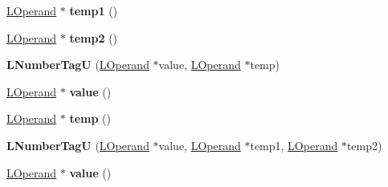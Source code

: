 \begin{DoxyCompactItemize}
\item 
\hyperlink{classv8_1_1internal_1_1_l_operand}{L\+Operand} $\ast$ {\bfseries temp1} ()\hypertarget{classv8_1_1internal_1_1_l_number_tag_u_af1b9a9050ae593071ec641d8db810594}{}\label{classv8_1_1internal_1_1_l_number_tag_u_af1b9a9050ae593071ec641d8db810594}

\item 
\hyperlink{classv8_1_1internal_1_1_l_operand}{L\+Operand} $\ast$ {\bfseries temp2} ()\hypertarget{classv8_1_1internal_1_1_l_number_tag_u_afac0fd287b623c724001aee50155b71c}{}\label{classv8_1_1internal_1_1_l_number_tag_u_afac0fd287b623c724001aee50155b71c}

\item 
{\bfseries L\+Number\+TagU} (\hyperlink{classv8_1_1internal_1_1_l_operand}{L\+Operand} $\ast$value, \hyperlink{classv8_1_1internal_1_1_l_operand}{L\+Operand} $\ast$temp)\hypertarget{classv8_1_1internal_1_1_l_number_tag_u_a11d948aa8adf7a4e01a2cf888db64118}{}\label{classv8_1_1internal_1_1_l_number_tag_u_a11d948aa8adf7a4e01a2cf888db64118}

\item 
\hyperlink{classv8_1_1internal_1_1_l_operand}{L\+Operand} $\ast$ {\bfseries value} ()\hypertarget{classv8_1_1internal_1_1_l_number_tag_u_a250600d81f63976f70111c5b90a2a5c3}{}\label{classv8_1_1internal_1_1_l_number_tag_u_a250600d81f63976f70111c5b90a2a5c3}

\item 
\hyperlink{classv8_1_1internal_1_1_l_operand}{L\+Operand} $\ast$ {\bfseries temp} ()\hypertarget{classv8_1_1internal_1_1_l_number_tag_u_a0032afc7d73dd5811b4518461a81a039}{}\label{classv8_1_1internal_1_1_l_number_tag_u_a0032afc7d73dd5811b4518461a81a039}

\item 
{\bfseries L\+Number\+TagU} (\hyperlink{classv8_1_1internal_1_1_l_operand}{L\+Operand} $\ast$value, \hyperlink{classv8_1_1internal_1_1_l_operand}{L\+Operand} $\ast$temp1, \hyperlink{classv8_1_1internal_1_1_l_operand}{L\+Operand} $\ast$temp2)\hypertarget{classv8_1_1internal_1_1_l_number_tag_u_a29c2cbf4352a712caccdaed62fc601d7}{}\label{classv8_1_1internal_1_1_l_number_tag_u_a29c2cbf4352a712caccdaed62fc601d7}

\item 
\hyperlink{classv8_1_1internal_1_1_l_operand}{L\+Operand} $\ast$ {\bfseries value} ()\hypertarget{classv8_1_1internal_1_1_l_number_tag_u_a250600d81f63976f70111c5b90a2a5c3}{}\label{classv8_1_1internal_1_1_l_number_tag_u_a250600d81f63976f70111c5b90a2a5c3}


\end{DoxyCompactItemize}
